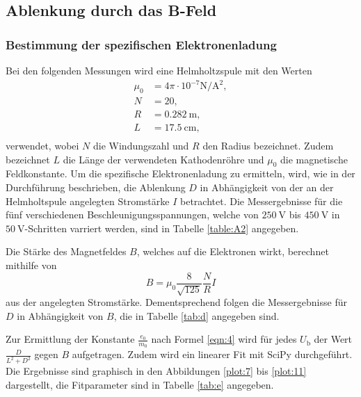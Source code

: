 \clearpage
\subsection{Ablenkung durch das B-Feld}
\subsubsection{Bestimmung der spezifischen Elektronenladung}
Bei den folgenden Messungen wird eine Helmholtzspule mit den Werten
\begin{align*}
  \mu_0 &= 4\pi \cdot 10^{-7}\si{\newton\per\ampere\tothe{2}},\\
  N    &= 20,\\
  R    &= \SI{0,282}{\metre} ,\\
  L    &= \SI{17,5}{\centi\metre} ,\\
\end{align*}
verwendet, wobei $N$ die Windungszahl und $R$ den Radius bezeichnet.
Zudem bezeichnet $L$ die Länge der verwendeten Kathodenröhre \cite{skript1} und $\mu_0$ die magnetische Feldkonstante.
Um die spezifische Elektronenladung zu ermitteln, wird, wie in der Durchführung beschrieben, die Ablenkung $D$ in Abhängigkeit von der an der Helmholtspule angelegten Stromstärke $I$ betrachtet.
Die Messergebnisse für die fünf verschiedenen Beschleunigungsspannungen, welche von $\SI{250}{\volt}$ bis $\SI{450}{\volt}$ in $\SI{50}{\volt}$-Schritten varriert werden, sind in Tabelle \ref{table:A2} angegeben.



Die Stärke des Magnetfeldes $B$, welches auf die Elektronen wirkt, berechnet mithilfe von
\begin{equation}
  B = \mu_0 \frac{8}{\sqrt{125}}\frac{N}{R} I
  \label{eqn:bfeld}
\end{equation}
aus der angelegten Stromstärke.
Dementsprechend folgen die Messergebnisse für $D$ in Abhängigkeit von $B$, die in Tabelle \ref{tab:d} angegeben sind.



Zur Ermittlung der Konstante $\frac{e_0}{m_0}$ nach Formel \eqref{eqn:4} wird für jedes $U_\text{b}$ der Wert $\frac{D}{L^2+D^2}$ gegen $B$ aufgetragen.
Zudem wird ein linearer Fit mit SciPy durchgeführt.
Die Ergebnisse sind graphisch in den Abbildungen \ref{plot:7} bis \ref{plot:11} dargestellt, die Fitparameter sind in Tabelle \ref{tab:e} angegeben.



